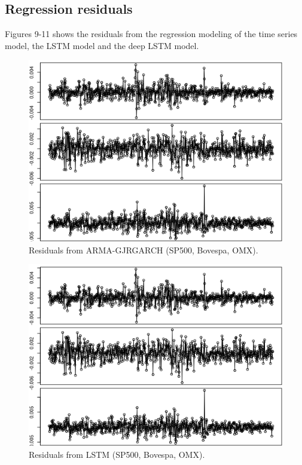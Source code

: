 \documentclass[12pt, letterpaper]{amsart}%
\begin{document}
\subsection{Regression residuals}
Figures 9-11 shows the residuals from the regression modeling of the time series model, the LSTM model and the deep LSTM model.


\begin{figure}
\caption{Residuals from ARMA-GJRGARCH (SP500, Bovespa, OMX).}
\centering
\includegraphics[scale=0.4]{garch_resid.png}
\end{figure}

\begin{figure}[H]
\caption{Residuals from LSTM (SP500, Bovespa, OMX).}
\centering
\includegraphics[scale=0.4]{lstm_resid.png}
\end{figure}
\end{document}
